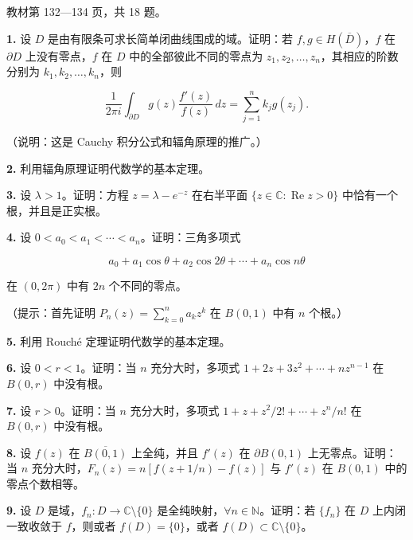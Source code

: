 \documentclass[11pt,a4paper]{article}
\begin{document}
教材第 132---134 页，共 18 题。

\par{}
\noindent\textbf{1.} 设 \(D\) 是由有限条可求长简单闭曲线围成的域。证明：若
\(f,g\in H(\overline D)\)，\(f\) 在 \(\partial D\) 上没有零点，\(f\) 在
\(D\) 中的全部彼此不同的零点为
\(z_1,z_2,\ldots,z_n\)，其相应的阶数分别为 \(k_1,k_2,\ldots,k_n\)，则

\[
\frac1{2\pi i}\int_{\partial D}g(z)\frac{f'(z)}{f(z)}\,dz
=\sum_{j=1}^nk_jg(z_j).
\]

（说明：这是 Cauchy 积分公式和辐角原理的推广。）

\par{}
\noindent\textbf{2.} 利用辐角原理证明代数学的基本定理。

\par{}
\noindent\textbf{3.} 设 \(\lambda>1\)。证明：方程 \(z=\lambda-e^{-z}\) 在右半平面
\(\{z\in\mathbb C:\operatorname{Re}z>0\}\) 中恰有一个根，并且是正实根。

\par{}
\noindent\textbf{4.} 设 \(0<a_0<a_1<\cdots<a_n\)。证明：三角多项式

\[
a_0+a_1\cos\theta+a_2\cos2\theta+\cdots+a_n\cos n\theta
\]

在 \((0,2\pi)\) 中有 \(2n\) 个不同的零点。

（提示：首先证明 \(P_n(z)=\sum_{k=0}^na_kz^k\) 在 \(B(0,1)\) 中有 \(n\)
个根。）

\par{}
\noindent\textbf{5.} 利用 Rouché 定理证明代数学的基本定理。

\par{}
\noindent\textbf{6.} 设 \(0<r<1\)。证明：当 \(n\) 充分大时，多项式
\(1+2z+3z^2+\cdots+nz^{n-1}\) 在 \(B(0,r)\) 中没有根。

\par{}
\noindent\textbf{7.} 设 \(r>0\)。证明：当 \(n\) 充分大时，多项式
\(1+z+z^2/2!+\cdots+z^n/n!\) 在 \(B(0,r)\) 中没有根。

\par{}
\noindent\textbf{8.} 设 \(f(z)\) 在 \(\overline{B(0,1)}\) 上全纯，并且 \(f'(z)\)
在 \(\partial B(0,1)\) 上无零点。证明：当 \(n\)
充分大时，\(F_n(z)=n[f(z+1/n)-f(z)]\) 与 \(f'(z)\) 在 \(B(0,1)\)
中的零点个数相等。

\par{}
\noindent\textbf{9.} 设 \(D\) 是域，\(f_n:D\to\mathbb C\setminus\{0\}\)
是全纯映射，\(\forall n\in\mathbb N\)。证明：若 \(\{f_n\}\) 在 \(D\)
上内闭一致收敛于 \(f\)，则或者 \(f(D)=\{0\}\)，或者
\(f(D)\subset\mathbb C\setminus\{0\}\)。
\end{document}
